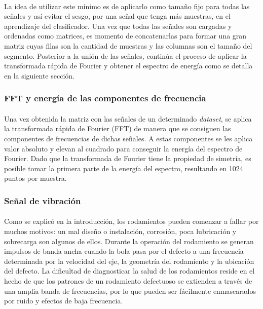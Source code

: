 \documentclass[12pt]{article}%
\begin{document}
\paragraph{}
La idea de utilizar este mínimo es de aplicarlo como tamaño fijo para todas las señales y así evitar el sesgo, por una señal que tenga más muestras, en el aprendizaje del clasificador. Una vez que todas las señales son cargadas y ordenadas como matrices, es momento de concatenarlas para formar una gran matriz cuyas filas son la cantidad de muestras y las columnas son el tamaño del segmento. Posterior a la unión de las señales, continúa el proceso de aplicar la transformada rápida de Fourier y obtener el espectro de energía como se detalla en la siguiente sección.

\subsubsection{FFT y energía de las componentes de frecuencia}
\paragraph{}
Una vez obtenida la matriz con las señales de un determinado \textit{dataset}, se aplica la transformada rápida de Fourier (FFT) de manera que se consiguen las componentes de frecuencias de dichas señales. A estas componentes se les aplica valor absoluto y elevan al cuadrado para conseguir la energía del espectro de Fourier. Dado que la transformada de Fourier tiene la propiedad de simetría, es posible tomar la primera parte de la energía del espectro, resultando en 1024 puntos por muestra.

\subsubsection{Señal de vibración}
\paragraph{}
Como se explicó en la introducción, los rodamientos pueden comenzar a fallar por muchos motivos: un mal diseño o instalación, corrosión, poca lubricación y sobrecarga son algunos de ellos. Durante la operación del rodamiento se generan impulsos de banda ancha cuando la bola pasa por el defecto a una frecuencia determinada por la velocidad del eje, la geometría del rodamiento y la ubicación del defecto. La dificultad de diagnosticar la salud de los rodamientos reside en el hecho de que los patrones de un rodamiento defectuoso se extienden a través de una amplia banda de frecuencias, por lo que pueden ser fácilmente enmascarados por ruido y efectos de baja frecuencia.
\end{document}
